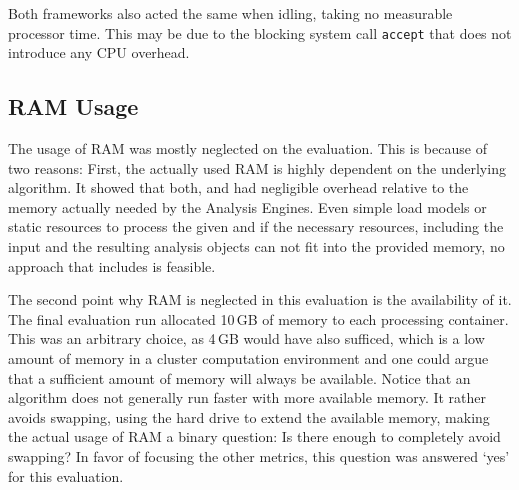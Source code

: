 Both frameworks also acted the same when idling, taking no measurable processor time. This may be due to the blocking system call \lstinline|accept| that does not introduce any CPU overhead.
\subsection{RAM Usage}
The usage of RAM was mostly neglected on the evaluation. This is because of two reasons: First, the actually used RAM is highly dependent on the underlying algorithm. It showed that both, \uimaas{} and \spark{} had negligible overhead relative to the memory actually needed by the Analysis Engines. Even simple \anens{} load models or static resources to process the given \cas{} and if the necessary resources, including the input \cas{} and the resulting analysis objects can not fit into the provided memory, no approach that includes \uima{} is feasible.

The second point why RAM is neglected in this evaluation is the availability of it. The final evaluation run allocated 10\,GB of memory to each processing container. This was an arbitrary choice, as 4\,GB would have also sufficed, which is a low amount of memory in a cluster computation environment and one could argue that a sufficient amount of memory will always be available. Notice that an algorithm does not generally run faster with more available memory. It rather avoids swapping, using the hard drive to extend the available memory, making the actual usage of RAM a binary question: Is there enough to completely avoid swapping? In favor of focusing the other metrics, this question was answered `yes' for this evaluation.

